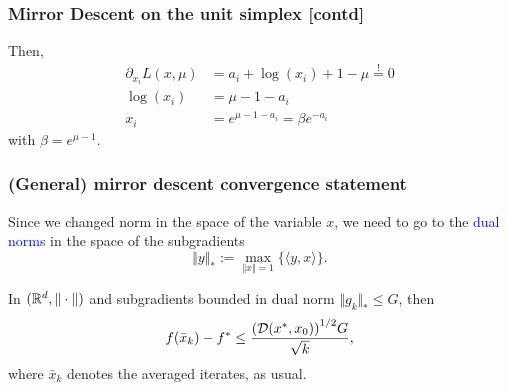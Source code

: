 \documentclass{beamer}
\begin{document}
\begin{frame}
  \frametitle{Mirror Descent on the unit simplex [contd]}
      Then,
      \begin{equation}
        \begin{aligned}
          \partial_{x_i} L(x,\mu) &= a_i + \log(x_i) +1 - \mu \overset{!}{=} 0 \\
          \log(x_i) &= \mu -1 - a_i  \\
          x_i &= e^{\mu - 1 - a_i} = \beta e^{-a_i}
        \end{aligned}
      \end{equation}
      with $\beta= e^{\mu-1}$.


\end{frame}


\begin{frame}
  \frametitle{(General) mirror descent convergence statement}
  Since we changed norm in the space of the variable $x$, we need to go to the \textcolor{blue}{dual norms} in the space of the subgradients
  \begin{equation}
    \Vert y \Vert_* := \max_{\Vert x \Vert=1} \{ \langle y, x \rangle\}.
  \end{equation}
  \begin{theorem}
    In $(\mathbb{R}^d, \Vert \cdot \Vert)$ and subgradients bounded in dual norm $\Vert g_k \Vert_* \le G$, then
    \begin{equation}
      f(\bar{x}_k) - f^* \le \frac{{(\mathcal{D}(x^*, x_0))}^{1/2} G}{\sqrt{k}},
    \end{equation}
    where $\bar{x}_k$ denotes the averaged iterates, as usual.
  \end{theorem}
\end{frame}
\end{document}

